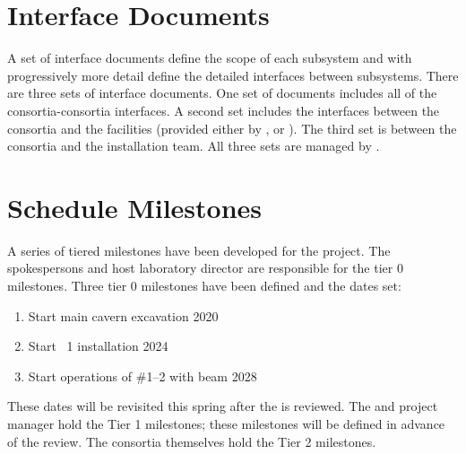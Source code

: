 \section{Interface Documents}
\label{sec:fdsp-coord-interface}

A set of interface documents define the scope of each subsystem and
with progressively more detail define the detailed interfaces between
subsystems. There are three sets of interface documents. One set of
documents includes all of the consortia-consortia interfaces. A second
set includes the interfaces between the consortia and the facilities
(provided either by ,  or ). The
third set is between the consortia and the installation team. All
three sets are managed by .






%

\section{Schedule Milestones}
\label{sec:fdsp-coord-controls}

A series of tiered milestones have been developed for the 
project. The spokespersons and host laboratory director are
responsible for the tier 0 milestones. Three tier 0 milestones have
been defined and the dates set:
\begin{enumerate}
\item Start main cavern excavation \hspace{2.58in} 2020
\item Start ~1 installation \hspace{2.1in} 2024
\item Start operations of  \#1--2 with beam \hspace{0.8in} 2028
\end{enumerate}
These dates will be revisited this spring after the  is reviewed. The
 and  project manager hold the Tier 1
milestones; these milestones will be defined in advance of the
 review. The consortia themselves hold the Tier 2
milestones.

